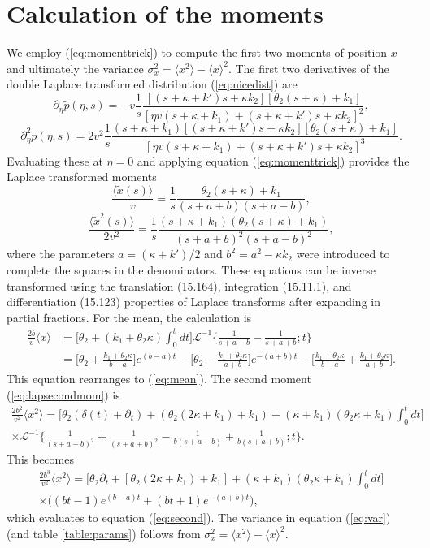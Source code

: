 \documentclass[]{agujournal2018}
\newcommand\be{\begin{equation}}
\newcommand\ee{\end{equation}}
\newcommand\bra{\langle}
\newcommand\ket{\rangle}
\newcommand\tp{\tilde{p}}
\newcommand\El{\mathcal{L}}
\begin{document}
\section{Calculation of the moments}
\label{sec:appendixB}
We employ (\ref{eq:momenttrick}) to compute the first two moments of position $x$ and ultimately the variance $\sigma_x^2 = \bra x^2\ket - \bra x \ket^2$. The first two derivatives of the double Laplace transformed distribution (\ref{eq:nicedist}) are
\be \partial_\eta \tp(\eta,s) = -v \frac{1}{s}\frac{[(s+\kappa + k')s + \kappa k_2][\theta_2(s+\kappa) + k_1]}{[\eta v(s+\kappa +k_1) + (s+ \kappa + k')s+\kappa k_2]^2},\ee
\be \partial_\eta^2 \tp(\eta,s) = 2v^2 \frac{1}{s} \frac{(s+\kappa+k_1)[(s+\kappa + k')s+\kappa k_2][\theta_2(s+\kappa) + k_1]}{[\eta v(s+\kappa + k_1) + (s+\kappa + k')s+ \kappa k_2]^3}.\ee
Evaluating these at $\eta=0$ and applying equation (\ref{eq:momenttrick}) provides the Laplace transformed moments
\be  \frac{\bra\tilde{x}(s)\ket} {v} = \frac{1}{s} \frac{\theta_2(s+\kappa)+k_1}{(s+a+b)(s+a-b)}\label{eq:lapmean},\ee
\be \frac{\bra \tilde{x}^2(s) \ket}{2v^2} = \frac{1}{s}\frac{(s+\kappa+k_1)(\theta_2(s+\kappa)+k_1)}{(s+a+b)^2(s+a-b)^2},\label{eq:lapsecondmom}\ee
where the parameters $a= (\kappa+k')/2$ and $b^2 = a^2 -\kappa k_2$ were introduced to complete the squares in the denominators.
These equations can be inverse transformed using the translation (15.164), integration (15.11.1), and differentiation (15.123) properties of Laplace transforms \citep{Arfken1985} after expanding in partial fractions.
For the mean, the calculation is
\begin{align}
\frac{2b}{v}\bra x \ket &= \big[\theta_2 + (k_1+\theta_2 \kappa)\int_0^t dt\big]\El^{-1}\Big\{ \frac{1}{s+a-b}-\frac{1}{s+a+b};t\Big\}\\
&= \Big[\theta_2 + \frac{k_1+\theta_2\kappa}{b-a}\Big]e^{(b-a)t} - \Big[\theta_2 - \frac{k_1+\theta_2\kappa}{a+b}\Big]e^{-(a+b)t} - \Big[\frac{k_1+\theta_2\kappa}{b-a} + \frac{k_1+\theta_2\kappa}{a+b}\Big].
\end{align}
This equation rearranges to (\ref{eq:mean}).
The second moment (\ref{eq:lapsecondmom}) is 
\begin{multline}
\frac{2b^2}{v^2}\bra x^2 \ket = \Big[\theta_2(\delta(t) + \partial_t) + (\theta_2(2\kappa + k_1)+k_1) + (\kappa+k_1)(\theta_2\kappa+k_1)\int_0^t dt \Big] \\
\times \El^{-1}\Big\{ \frac{1}{(s+a-b)^2} + \frac{1}{(s+a+b)^2}-\frac{1}{b(s+a-b)}+\frac{1}{b(s+a+b)};t\Big\}.
\end{multline}
This becomes 
\begin{multline}
\frac{2b^3}{v^2}\bra x^2 \ket = \Big[\theta_2\partial_t + [\theta_2(2\kappa+k_1)+k_1] + (\kappa+k_1)(\theta_2\kappa+k_1)\int_0^tdt\Big]\\
\times \Big((bt-1)e^{(b-a)t}+(bt+1)e^{-(a+b)t}\Big),
\end{multline}
which evaluates to equation (\ref{eq:second}).
The variance in equation (\ref{eq:var}) (and table \ref{table:params}) follows from $\sigma_x^2 = \bra x^2 \ket - \bra x \ket^2.$
\end{document}
